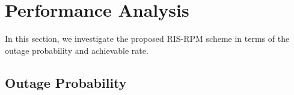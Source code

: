 \documentclass[draftclsnofoot,onecolumn,12pt]{IEEEtran}
\begin{document}


\section{Performance Analysis}\label{analysis}

In this section, we investigate the proposed RIS-RPM scheme in terms of the outage probability and achievable rate. 

\subsection{Outage Probability}\label{sec of outage}
\end{document}
